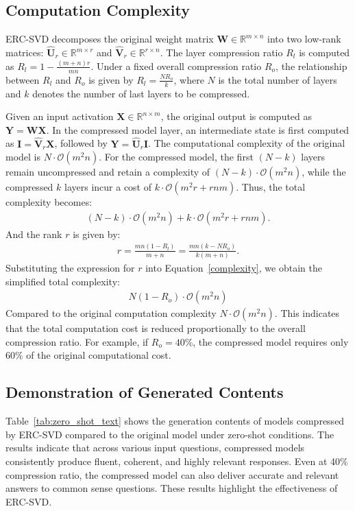 \subsection{Computation Complexity} \label{inference_efficiency_analysis}
ERC-SVD decomposes the original weight matrix $\boldsymbol{W}\in\mathbb{R}^{m\times n}$ into two low-rank matrices: $\hat{\boldsymbol{U}}_r\in\mathbb{R}^{m\times r}$ and $\hat{\boldsymbol{V}}_r\in\mathbb{R}^{r\times n}$. 
The layer compression ratio $R_l$ is computed as $R_l = 1 - \frac{(m+n)r}{mn}$. 
Under a fixed overall compression ratio $R_o$, the relationship between $R_l$ and $R_o$ is given by $R_l = \frac{N R_o}{k}$, where $N$ is the total number of layers and $k$ denotes the number of last layers to be compressed.

Given an input activation $\boldsymbol{X} \in \mathbb{R}^{n \times m}$, the original output is computed as $\boldsymbol{Y} = \boldsymbol{W} \boldsymbol{X}$. 
In the compressed model layer, an intermediate state is first computed as $\boldsymbol{I} = \hat{\boldsymbol{V}}_r \boldsymbol{X}$, followed by $\boldsymbol{Y} = \hat{\boldsymbol{U}}_r \boldsymbol{I}$.
The computational complexity of the original model is $N \cdot \mathcal{O}(m^2 n)$.
For the compressed model, the first $(N - k)$ layers remain uncompressed and retain a complexity of $(N - k) \cdot \mathcal{O}(m^2 n)$, while the compressed $k$ layers incur a cost of $k \cdot \mathcal{O}(m^2 r + r n m)$.
Thus, the total complexity becomes:
\begin{align}
    (N-k)\cdot\mathcal{O}(m^2n)+k\cdot\mathcal{O}(m^2r+rnm).
    \label{complexity}
\end{align}
And the rank $r$ is given by:
\begin{align}
    r = \frac{mn(1-R_l)}{m+n} = \frac{mn(k-NR_o)}{k(m+n)}.
    \label{rank}
\end{align}
Substituting the expression for $r$ into Equation~\ref{complexity}, we obtain the simplified total complexity:
\begin{align}
    \boxed{N(1-R_o)\cdot\mathcal{O}(m^2n)}
\end{align}
Compared to the original computation complexity $N \cdot \mathcal{O}(m^2 n)$. This indicates that the total computation cost is reduced proportionally to the overall compression ratio.
For example, if $R_o = 40$\%, the compressed model requires only 60\% of the original computational cost.

\subsection{Demonstration of Generated Contents} \label{generated_content}
Table~\ref{tab:zero_shot_text} shows the generation contents of models compressed by ERC-SVD compared to the original model under zero-shot conditions. The results indicate that across various input questions, compressed models consistently produce fluent, coherent, and highly relevant responses. Even at 40\% compression ratio, the compressed model can also deliver accurate and relevant answers to common sense questions. These results highlight the effectiveness of ERC-SVD.

